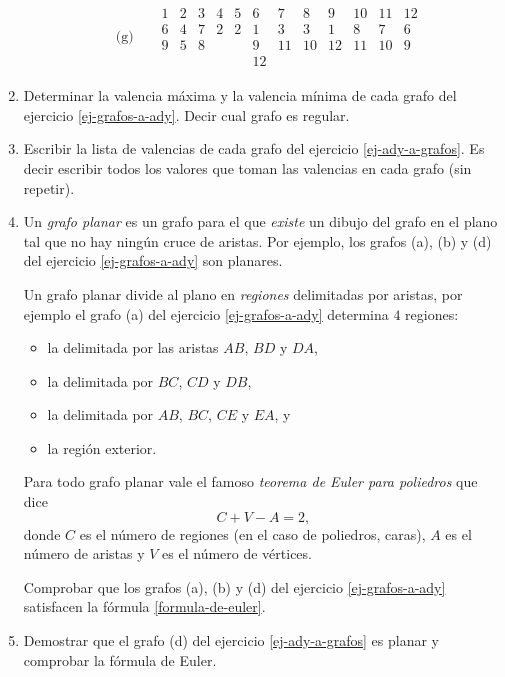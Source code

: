 \documentclass[a4paper,12pt,twoside,spanish,reqno]{amsbook}
\numberwithin{equation}{section}
\begin{document}
\begin{enumerate}
\begin{align*}
    &\text{(g)}&&\begin{matrix}
        1& 2& 3& 4& 5& 6& 7& 8& 9& 10& 11& 12\\ \hline
        6& 4& 7& 2& 2& 1& 3& 3& 1& 8& 7& 6\\
        9& 5& 8& & & 9& 11& 10& 12& 11& 10& 9\\
        & & & & & 12& & & & & &
       \end{matrix}
\end{align*}

\item Determinar la valencia máxima y la valencia mínima de cada grafo del ejercicio \ref{ej-grafos-a-ady}. Decir cual grafo es regular. 
    
\item   Escribir la lista de valencias de cada grafo del ejercicio \ref{ej-ady-a-grafos}. Es decir escribir todos los valores que toman las valencias en cada grafo (sin repetir).

\item Un  {\em grafo planar} es un grafo para el que  \textit{existe} un dibujo del grafo en el plano tal que no hay ningún cruce de aristas. Por ejemplo, los grafos (a), (b) y (d) del ejercicio \ref{ej-grafos-a-ady} son planares. 

Un  grafo planar divide al plano en \textit{regiones} delimitadas por aristas, por ejemplo el grafo (a) del ejercicio  \ref{ej-grafos-a-ady} determina $4$ regiones: 
\begin{itemize}
    \item la delimitada por las aristas $AB$, $BD$ y $DA$,
    \item la delimitada por  $BC$, $CD$ y $DB$,
    \item  la delimitada por  $AB$, $BC$, $CE$ y $EA$, y 
    \item la región exterior.
\end{itemize}
Para todo grafo planar vale el famoso \textit{teorema de Euler para poliedros} que dice 
\begin{equation}\label{formula-de-euler}
    C + V - A = 2, \tag{*}
\end{equation}
donde $C$ es el número de regiones (en el caso de poliedros, caras), $A$ es el número de aristas y $V$ es el número de vértices.

Comprobar que los grafos (a), (b) y (d) del ejercicio  \ref{ej-grafos-a-ady} satisfacen la fórmula \eqref{formula-de-euler}. 

\item Demostrar que el grafo (d) del ejercicio \ref{ej-ady-a-grafos} es planar y comprobar la fórmula de Euler.


\end{enumerate}
\end{document}
